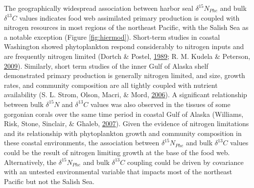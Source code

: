 \documentclass [11pt, proquest] {uwthesis}[2015/03/03]
\begin{document}
The geographically widespread association between harbor seal
\(\delta^{15}N_{Phe}\) and bulk \(\delta^{13}C\) values indicates food
web assimilated primary production is coupled with nitrogen resources in
most regions of the northeast Pacific, with the Salish Sea as a notable
exception (Figure \ref{fig:hiermod}). Short-term studies in coastal
Washington showed phytoplankton respond considerably to nitrogen inputs
and are frequently nitrogen limited (Dortch \& Postel,
\protect\hyperlink{ref-Dortch1989}{1989}; R. M. Kudela \& Peterson,
\protect\hyperlink{ref-Kudela2009}{2009}). Similarly, short term studies
of the inner Gulf of Alaska shelf demonstrated primary production is
generally nitrogen limited, and size, growth rates, and community
composition are all tightly coupled with nutrient availability (S. L.
Strom, Olson, Macri, \& Mord, \protect\hyperlink{ref-Strom2006}{2006}).
A significant relationship between bulk \(\delta^{15}N\) and
\(\delta^{13}C\) values was also observed in the tissues of some
gorgonian corals over the same time period in coastal Gulf of Alaska
(Williams, Risk, Stone, Sinclair, \& Ghaleb,
\protect\hyperlink{ref-Williams2007}{2007}). Given the evidence of
nitrogen limitations and its relationship with phytoplankton growth and
community composition in these coastal environments, the association
between \(\delta^{15}N_{Phe}\) and bulk \(\delta^{13}C\) values could be
the result of nitrogen limiting growth at the base of the food web.
Alternatively, the \(\delta^{15}N_{Phe}\) and bulk \(\delta^{13}C\)
coupling could be driven by covariance with an untested environmental
variable that impacts most of the northeast Pacific but not the Salish
Sea.
\end{document}
